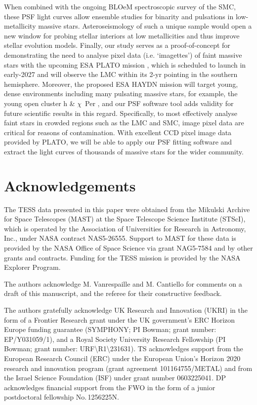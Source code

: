 \documentclass[fleqn,usenatbib]{mnras}
\begin{document}
When combined with the ongoing BLOeM spectroscopic survey of the SMC, these PSF light curves allow ensemble studies for binarity and pulsations in low-metallicity massive stars. Asteroseismology of such a unique sample would open a new window for probing stellar interiors at low metallicities and thus improve stellar evolution models. Finally, our study serves as a proof-of-concept for demonstrating the need to analyse pixel data (i.e. `imagettes') of faint massive stars with the upcoming ESA PLATO mission \citep{Rauer2025}, which is scheduled to launch in early-2027 and will observe the LMC within its 2-yr pointing in the southern hemisphere. Moreover, the proposed ESA HAYDN mission \citep{Miglio+2021} will target young, dense environments including many pulsating massive stars, for example, the young open cluster h \& $\chi$~Per \citep{Saesen+2013, Nardini+2025}, and our PSF software tool adds validity for future scientific results in this regard. Specifically, to most effectively analyse faint stars in crowded regions such as the LMC and SMC, image pixel data are critical for reasons of contamination. With excellent CCD pixel image data provided by PLATO, we will be able to apply our PSF fitting software and extract the light curves of thousands of massive stars for the wider community.

\section*{Acknowledgements}

The TESS data presented in this paper were obtained from the Mikulski Archive for Space Telescopes (MAST) at the Space Telescope Science Institute (STScI), which is operated by the Association of Universities for Research in Astronomy, Inc., under NASA contract NAS5-26555. Support to MAST for these data is provided by the NASA Office of Space Science via grant NAG5-7584 and by other grants and contracts. Funding for the TESS mission is provided by the NASA Explorer Program.

The authors acknowledge M. Vanrespaille and M. Cantiello for comments on a draft of this manuscript, and the referee for their constructive feedback.

The authors gratefully acknowledge UK Research and Innovation (UKRI) in the form of a Frontier Research grant under the UK government's ERC Horizon Europe funding guarantee (SYMPHONY; PI Bowman; grant number: EP/Y031059/1), and a Royal Society University Research Fellowship (PI Bowman; grant number: URF{\textbackslash}R1{\textbackslash}231631). TS acknowledges support from the European Research Council (ERC) under the European Union's Horizon 2020 research and innovation program (grant agreement 101164755/METAL) and from the Israel Science Foundation (ISF) under grant number 0603225041. DP acknowledges financial support from the FWO in the form of a junior postdoctoral fellowship No.\,1256225N.
\end{document}
